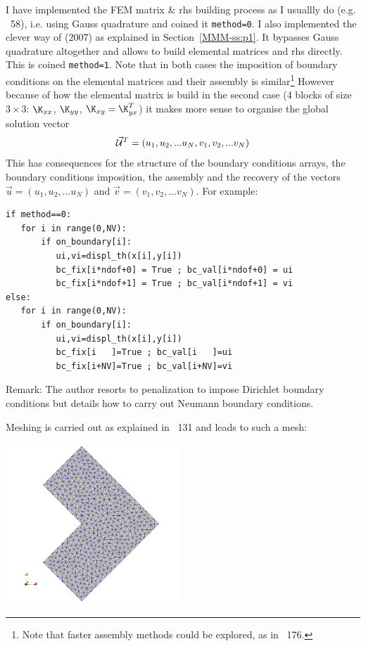 I have implemented the FEM matrix \& rhs building process as I 
usuallly do (e.g. \stone~58), i.e. using Gauss quadrature and
coined it \lstinline{method=0}.
I also implemented the clever way of \textcite{koko07} (2007)
as explained in Section~\ref{MMM-ss:p1}. It bypasses Gauss quadrature
altogether and allows to build elemental matrices and rhs directly.
This is coined \lstinline{method=1}.
Note that in both cases the imposition of boundary conditions on the 
elemental matrices and their assembly is similar\footnote{Note 
that faster assembly methods could be explored, as in \stone~176.} 
However because of how the elemental matrix is build in the second case
(4 blocks of size $3\times 3$: $\K_{xx}$, $\K_{yy}$, $\K_{xy}=\K_{yx}^T$)
it makes more sense to organise the global solution vector 
\[
\vec{\cal U}^T=(u_1,u_2, ...u_N,v_1,v_2,... v_N)
\]
This has consequences for the structure of the boundary conditions arrays, 
the boundary conditions imposition, the assembly and the recovery of 
the vectors $\vec{u}=(u_1,u_2,...u_N)$ and $\vec{v}=(v_1,v_2,...v_N)$. 
For example:
\begin{lstlisting}
if method==0:
   for i in range(0,NV):
       if on_boundary[i]: 
          ui,vi=displ_th(x[i],y[i])
          bc_fix[i*ndof+0] = True ; bc_val[i*ndof+0] = ui
          bc_fix[i*ndof+1] = True ; bc_val[i*ndof+1] = vi
else:
   for i in range(0,NV):
       if on_boundary[i]: 
          ui,vi=displ_th(x[i],y[i])
          bc_fix[i   ]=True ; bc_val[i   ]=ui
          bc_fix[i+NV]=True ; bc_val[i+NV]=vi
\end{lstlisting}



Remark: The author resorts to penalization to impose Dirichlet 
boundary conditions but details how to carry out Neumann boundary conditions.

Meshing is carried out as explained in \stone~131 and leads to such a mesh:
\begin{center}
\includegraphics[width=6.6cm]{python_codes/fieldstone_179/RESULTS/mesh}
\end{center}



